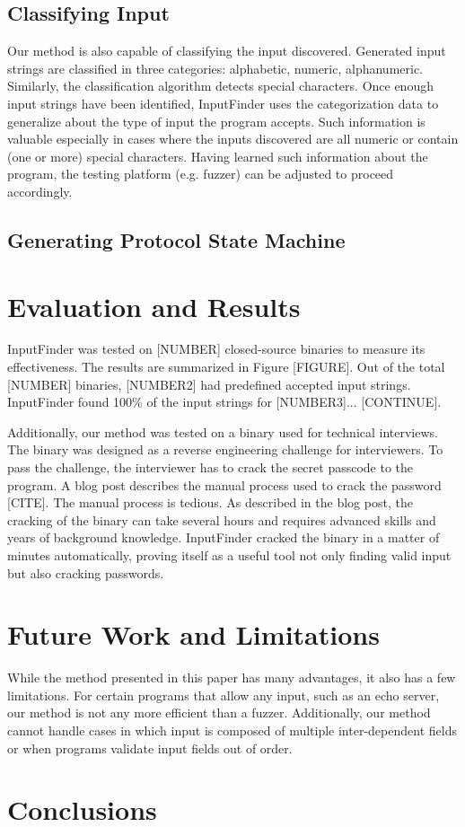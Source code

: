 \documentclass[10pt,twocolumn]{article}
\def \tool {InputFinder}
\begin{document}
\subsection{Classifying Input}

Our method is also capable of classifying the input discovered.
Generated input strings are classified in three categories: alphabetic, numeric, alphanumeric.
Similarly, the classification algorithm detects special characters.
Once enough input strings have been identified, \tool{} uses the categorization data to generalize about the type of input the program accepts.
Such information is valuable especially in cases where the inputs discovered are all numeric or contain (one or more) special characters.
Having learned such information about the program, the testing platform (e.g. fuzzer) can be adjusted to proceed accordingly.

\subsection{Generating Protocol State Machine}

\section{Evaluation and Results}

\tool{} was tested on [NUMBER] closed-source binaries to measure its effectiveness.
The results are summarized in Figure [FIGURE].
Out of the total [NUMBER] binaries, [NUMBER2] had predefined accepted input strings.
\tool{} found 100\% of the input strings for [NUMBER3]...
[CONTINUE].

Additionally, our method was tested on a binary used for technical interviews.
The binary was designed as a reverse engineering challenge for interviewers.
To pass the challenge, the interviewer has to crack the secret passcode to the program.
A blog post describes the manual process used to crack the password [CITE].
The manual process is tedious.
As described in the blog post, the cracking of the binary can take several hours and requires advanced skills and years of background knowledge.
\tool{} cracked the binary in a matter of minutes automatically, proving itself as a useful tool not only finding valid input but also cracking passwords.

\section{Future Work and Limitations}

While the method presented in this paper has many advantages, it also has a few limitations.
For certain programs that allow any input, such as an echo server, our method is not any more efficient than a fuzzer.
Additionally, our method cannot handle cases in which input is composed of multiple inter-dependent fields or when programs validate input fields out of order.

\section{Conclusions}
\end{document}
